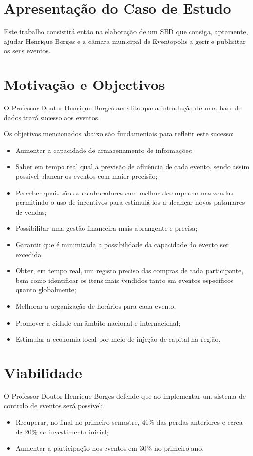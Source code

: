 \documentclass[a4paper,12pt]{scrreprt}
\begin{document}
    \section{Apresentação do Caso de Estudo}
    Este trabalho consistirá então na elaboração de um SBD que consiga, aptamente, ajudar Henrique Borges
    e a c\^amara municipal de Eventopolis a gerir e publicitar os seus eventos.
    
    \section{Motivação e Objectivos}
    O Professor Doutor Henrique Borges acredita que a introdu\c{c}\~{a}o de uma base de dados
    trar\'{a} sucesso aos eventos.

    Os objetivos mencionados abaixo s\~{a}o fundamentais para refletir este sucesso:
    \begin{itemize}
    \item Aumentar a capacidade de armazenamento de informa\c{c}\~{o}es;
    \item Saber em tempo real qual a previsão de afluência de cada evento, sendo assim possível
planear os eventos com maior precisão;
    \item Perceber quais são os colaboradores com melhor desempenho nas vendas, permitindo o
uso de incentivos para estimulá-los a alcançar novos patamares de vendas;
    \item Possibilitar uma gestão financeira mais abrangente e precisa;
    \item Garantir que é minimizada a possibilidade da capacidade do evento ser excedida;
    \item Obter, em tempo real, um registo preciso das compras de cada participante, bem como
identificar os itens mais vendidos tanto em eventos específicos quanto globalmente;
    \item Melhorar a organiza\c{c}\~{a}o de hor\'{a}rios para cada evento;
    \item Promover a cidade em \^{a}mbito nacional e internacional;
    \item Estimular a economia local por meio de inje\c{c}\~{a}o de capital na regi\~{a}o.
    \end{itemize}

        \section{Viabilidade}
        O Professor Doutor Henrique Borges defende que ao implementar um sistema de controlo de eventos
        será possível: 
        \begin{itemize}
          \item Recuperar, no final no primeiro semestre, $40\%$ das perdas anteriores e cerca de $20\%$
            do investimento inicial;
          \item Aumentar a participação nos eventos em $30\%$ no primeiro ano.
        \end{itemize}
\end{document}
